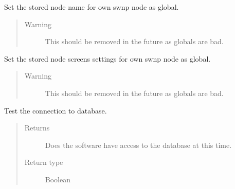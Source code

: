 \documentclass[letterpaper,10pt,english]{sphinxmanual}
\begin{document}

\begin{fulllineitems}
\label{controller:controller.common.set_node_name}
Set the stored node name for own swnp node as global.
\begin{quote}\begin{description}
\item[{Warning }] \leavevmode
This should be removed in the future as globals are bad.

\end{description}\end{quote}

\end{fulllineitems}


\begin{fulllineitems}
\label{controller:controller.common.set_node_screens}
Set the stored node screens settings for own swnp node as global.
\begin{quote}\begin{description}
\item[{Warning }] \leavevmode
This should be removed in the future as globals are bad.

\end{description}\end{quote}

\end{fulllineitems}


\begin{fulllineitems}
\label{controller:controller.common.test_connection}
Test the connection to database.
\begin{quote}\begin{description}
\item[{Returns}] \leavevmode
Does the software have access to the database at this time.

\item[{Return type}] \leavevmode
Boolean

\end{description}\end{quote}

\end{fulllineitems}
\end{document}

